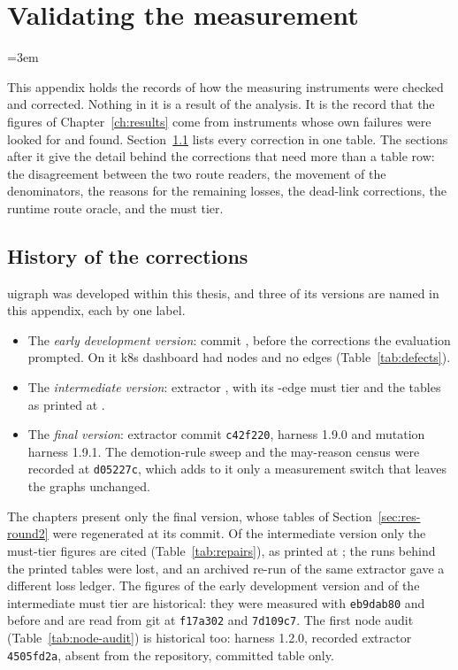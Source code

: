 \chapter{Validating the measurement}
\label{app:validation}
\emergencystretch=3em

This appendix holds the records of how the measuring instruments were checked and corrected. Nothing in it is a result of the analysis. It is the record that the figures of Chapter~\ref{ch:results} come from instruments whose own failures were looked for and found. Section~\ref{app:repairs} lists every correction in one table. The sections after it give the detail behind the corrections that need more than a table row: the disagreement between the two route readers, the movement of the denominators, the reasons for the remaining losses, the dead-link corrections, the runtime route oracle, and the must tier.

\section{History of the corrections}
\label{app:repairs}

uigraph was developed within this thesis, and three of its versions are named in this appendix, each by one label.
\begin{itemize}
\item The \emph{early development version}: commit \EarlierCommit{}, before the corrections the evaluation
  prompted. On it k8s dashboard had nodes and no edges (Table~\ref{tab:defects}).
\item The \emph{intermediate version}: extractor \RoundExtractor{}, with its
\RoundMustEdges{}-edge must tier and the tables as printed at \RoundCommit{}.
\item The \emph{final version}: extractor commit \texttt{c42f220}, harness 1.9.0 and mutation
harness 1.9.1. The demotion-rule sweep and the may-reason census were recorded at
\texttt{d05227c}, which adds to it only a measurement switch that leaves the graphs unchanged.
\end{itemize}
The chapters present only the final version, whose tables of Section~\ref{sec:res-round2} were regenerated at its commit.
Of the intermediate version only the must-tier figures are cited (Table~\ref{tab:repairs}), as printed at \RoundCommit{}; the runs behind
the printed tables were lost, and an archived re-run of the same extractor gave a different loss ledger.
The figures of the early development version and of the intermediate must tier are historical: they were measured with
\texttt{eb9dab80} and before and are read from git at \texttt{f17a302} and \texttt{7d109c7}. The first node audit
(Table~\ref{tab:node-audit}) is historical too: harness 1.2.0, recorded extractor \texttt{4505fd2a}, absent from the
repository, committed table only.

